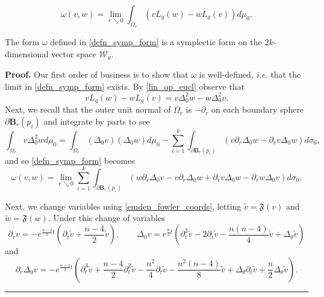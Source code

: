 \documentclass[10pt,a4paper]{amsart}
\newcommand{\B}{\mathbf{B}}
\newenvironment{proof}[1][Proof]{\noindent\textbf{#1.} }{\hfill\rule{0.5em}{0.5em}}
\begin{document}
\begin{equation} \label{defn_symp_form}
\omega(v,w) = \lim_{r \searrow 0} \int_{\Omega_r} (v L_g (w) - 
w L_g (v) )d\mu_0.\end{equation} 

\begin{theorem} \label{thm:symp_form} 
The form $\omega$ defined in \eqref{defn_symp_form} is a 
symplectic form on the $2k$-dimensional vector space $\mathcal{W}_g$. 
\end{theorem}

\begin{proof} Our first order of business is to show that 
$\omega$ is well-defined, {\it i.e.} that the limit in \eqref{defn_symp_form}
exists. By \eqref{lin_op_eucl} observe that 
$$vL_g(w) - wL_g(v) = v \Delta_0^2 w - w \Delta_0^2 v.$$
Next, we recall that the outer unit normal of $\Omega_r$ is 
$-\partial_r$ on each boundary sphere $\partial \B_r(p_i)$ 
and integrate by parts to see 
$$\int_{\Omega_r} v\Delta_0^2 w d\mu_0 = \int_{\Omega_r} 
(\Delta_0 v) (\Delta_0 w) d\mu_0 - \sum_{i=1}^k \int_{\partial 
\B_r(p_i)} (v \partial_r \Delta_0 w - \partial_r v \Delta_0 w
)d\sigma_0,$$
and so \eqref{defn_symp_form} becomes 
 \begin{equation} \label{symp_form2} 
 \omega(v,w) = \lim_{r \searrow 0} \sum_{i=1}^k 
 \int_{\partial \B_r(p_i)} (w \partial_r \Delta_0 v - v \partial_r \Delta_0 w
 + \partial_r v \Delta_0 w - \partial_r w \Delta_0 v )d\sigma_0.\end{equation} 

 Next, we change variables using \eqref{emden_fowler_coords}, letting 
 $\widetilde v = \mathfrak{F}(v)$ and $\widetilde w= \mathfrak{F}(w)$. Under this 
 change of variables 
 \begin{equation} \label{transformed_derivatives1} 
 \partial_r v = -e^{ \frac{n-2}{2}t} 
 \left ( \partial_t \widetilde v + \frac{n-4}{2} \widetilde v \right ), 
 \qquad \Delta_0 v = e^{\frac{n}{2}t} \left ( \partial_t^2 \widetilde v - 2 \partial_t 
 \widetilde v -\frac{n(n-4)}{4} \widetilde v + \Delta_\theta \widetilde v \right )
 \end{equation} 
 and 
 \begin{equation} \label{transformed_derivatives2} 
 \partial_r \Delta_0 v = -e^{\frac{n+2}{2}t} \left ( \partial_t^3 
 \widetilde v + \frac{n-4}{2} \partial_t^2 \widetilde v -\frac{n^2}{4} \partial_t \widetilde v
 -\frac{n^2(n-4)}{8} \widetilde v + \Delta_\theta \partial_t \widetilde v + \frac{n}{2} \Delta_\theta 
 \widetilde v \right ).\end{equation} 



\end{proof}
\end{document}
